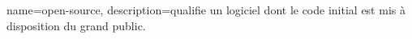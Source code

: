\makeglossaries

{
	name=open-source,
	description={qualifie un logiciel dont le code initial est mis à disposition du grand public.}
}
